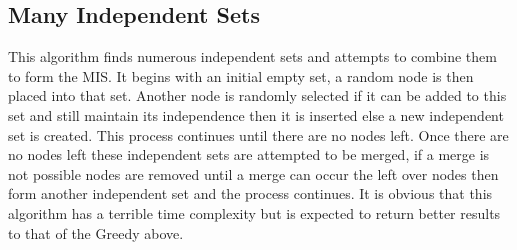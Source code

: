 \documentclass[conference]{IEEEtran}
\begin{document}




\subsection{Many Independent Sets}
This algorithm finds numerous independent sets and attempts to combine them to form the MIS. It begins with an initial 
empty set, a random node is then placed into that set. Another node is randomly selected if it can be added to this set
and still maintain its independence then it is inserted else a new independent set is created. This process continues 
until there are no nodes left. Once there are no nodes left these independent sets are attempted to be merged, if a merge 
is not possible nodes are removed until a merge can occur the left over nodes then form another independent set and the 
process continues. It is obvious that this algorithm has a terrible time complexity but is expected to return better 
results to that of the Greedy above.
\end{document}
